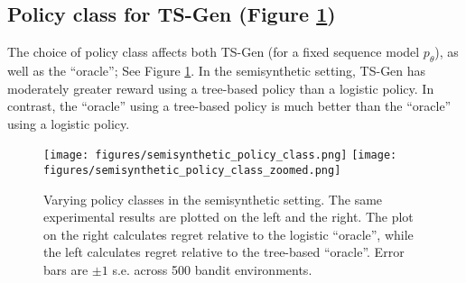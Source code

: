 \subsection{Policy class for TS-Gen (Figure \ref{fig:semisynthetic_policy_class_comparison})}
\label{sec:policy_class}
The choice of policy class affects both TS-Gen (for a fixed sequence model $p_\theta$), as well as the ``oracle''; See Figure \ref{fig:semisynthetic_policy_class_comparison}. In the semisynthetic setting, TS-Gen has moderately greater reward using a tree-based policy than a logistic policy. In contrast, the ``oracle'' using a tree-based policy is much better than the ``oracle'' using a logistic policy. 

\begin{figure}[h]
\centering\texttt{[image: figures/semisynthetic\_policy\_class.png]}
\centering\texttt{[image: figures/semisynthetic\_policy\_class\_zoomed.png]}
\caption{Varying policy classes in the semisynthetic setting. The same experimental results are plotted on the left and the right. The plot on the right calculates regret relative to the logistic ``oracle'', while the left calculates regret relative to the tree-based ``oracle''. 
Error bars are $\pm 1$ s.e. across 500 bandit environments.}
\label{fig:semisynthetic_policy_class_comparison}
\end{figure}